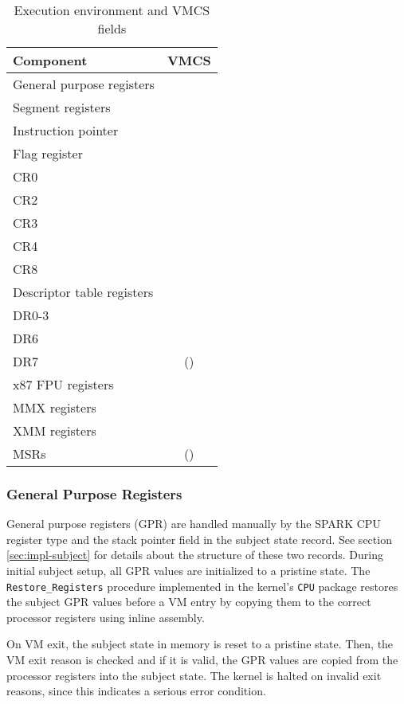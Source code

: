 \begin{table}[h]
	\centering
	\begin{tabular}{l|c}
		\textbf{Component} & \textbf{VMCS} \\
		\hline
		General purpose registers  & \\
		Segment registers          & \checkmark \\
		Instruction pointer        & \checkmark \\
		Flag register              & \checkmark \\
		CR0                        & \checkmark \\
		CR2                        & \\
		CR3                        & \checkmark \\
		CR4                        & \checkmark \\
		CR8                        & \\
		Descriptor table registers & \checkmark \\
		DR0-3                      & \\
		DR6                        & \\
		DR7                        & (\checkmark) \\
		x87 FPU registers          & \\
		MMX registers              & \\
		XMM registers              & \\
		MSRs                       & (\checkmark) \\
	\end{tabular}
	\caption{Execution environment and VMCS fields}
	\label{tab:exec-env-storage}
\end{table}

\subsubsection{General Purpose Registers}
General purpose registers (GPR) are handled manually by the SPARK
CPU register type and the stack pointer field in the subject state record. See
section \ref{sec:impl-subject} for details about the structure of these two
records.  During initial subject setup, all GPR values are initialized to a
pristine state. The \texttt{Restore\_Registers} procedure implemented in the
kernel's \texttt{CPU} package restores the subject GPR values before a VM entry
by copying them to the correct processor registers using inline assembly.

On VM exit, the subject state in memory is reset to a pristine state. Then, the
VM exit reason is checked and if it is valid, the GPR values are copied from the
processor registers into the subject state. The kernel is halted on invalid exit
reasons, since this indicates a serious error condition.


